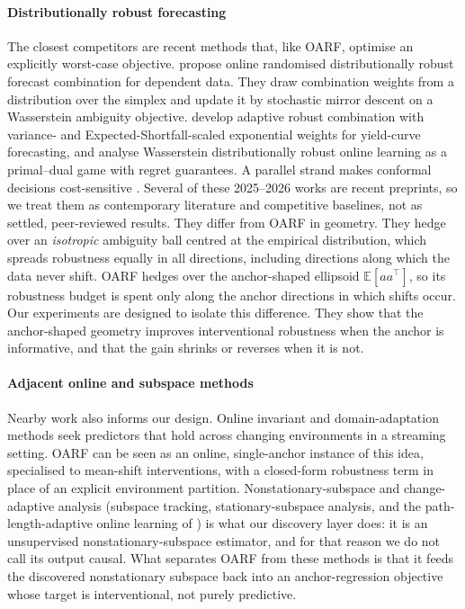 \documentclass[authoryear,preprint,12pt]{elsarticle}
\theoremstyle{plain}
\theoremstyle{remark}
\newcommand{\E}{\mathbb{E}}
\newcommand{\OARF}{\textsc{OARF}}
\begin{document}
\paragraph{Distributionally robust forecasting} The closest competitors are
recent methods that, like \OARF{}, optimise an explicitly worst-case objective.
\citet{wang2026online} propose online randomised distributionally robust forecast
combination for dependent data. They draw combination weights from a distribution
over the simplex and update it by stochastic mirror descent on a Wasserstein
ambiguity objective. \citet{liu2026fcdro} develop adaptive robust combination with
variance- and Expected-Shortfall-scaled exponential weights for yield-curve
forecasting, and \citet{chen2026wdro} analyse Wasserstein distributionally robust
online learning as a primal--dual game with regret guarantees. A parallel strand
makes conformal decisions cost-sensitive \citep{costaci2026}. Several of these
2025--2026 works are recent preprints, so we treat them as contemporary literature
and competitive baselines, not as settled, peer-reviewed results. They differ from
\OARF{} in geometry. They hedge over an \emph{isotropic} ambiguity ball centred at
the empirical distribution, which spreads robustness equally in all directions,
including directions along which the data never shift. \OARF{} hedges over the
anchor-shaped ellipsoid $\E[aa^\top]$, so its robustness budget is spent only
along the anchor directions in which shifts occur. Our experiments are designed to
isolate this difference. They show that the anchor-shaped geometry improves
interventional robustness when the anchor is informative, and that the gain shrinks
or reverses when it is not.

\paragraph{Adjacent online and subspace methods} Nearby work also informs our
design. Online invariant and domain-adaptation methods seek predictors that hold
across changing environments in a streaming setting. \OARF{} can be seen as an
online, single-anchor instance of this idea, specialised to mean-shift
interventions, with a closed-form robustness term in place of an explicit
environment partition. Nonstationary-subspace and change-adaptive analysis
(subspace tracking, stationary-subspace analysis, and the path-length-adaptive
online learning of \citealp{zhang2018adaptive}) is what our discovery layer does:
it is an unsupervised nonstationary-subspace estimator, and for that reason we do
not call its output causal. What separates \OARF{} from these methods is that it
feeds the discovered nonstationary subspace back into an anchor-regression
objective whose target is interventional, not purely predictive.
\end{document}
